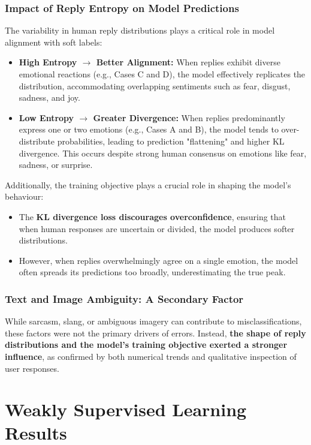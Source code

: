 \subsubsection*{Impact of Reply Entropy on Model Predictions}
The variability in human reply distributions plays a critical role in model alignment with soft labels:
\begin{itemize}
    \item \textbf{High Entropy $\rightarrow$ Better Alignment:} When replies exhibit diverse emotional reactions (e.g., Cases C and D), the model effectively replicates the distribution, accommodating overlapping sentiments such as fear, disgust, sadness, and joy.
    \item \textbf{Low Entropy $\rightarrow$ Greater Divergence:} When replies predominantly express one or two emotions (e.g., Cases A and B), the model tends to over-distribute probabilities, leading to prediction "flattening" and higher KL divergence. This occurs despite strong human consensus on emotions like fear, sadness, or surprise.
\end{itemize}

Additionally, the training objective plays a crucial role in shaping the model’s behaviour:
\begin{itemize}
    \item The \textbf{KL divergence loss discourages overconfidence}, ensuring that when human responses are uncertain or divided, the model produces softer distributions.
    \item However, when replies overwhelmingly agree on a single emotion, the model often spreads its predictions too broadly, underestimating the true peak.
\end{itemize}

\subsubsection*{Text and Image Ambiguity: A Secondary Factor}
While sarcasm, slang, or ambiguous imagery can contribute to misclassifications, these factors were not the primary drivers of errors. Instead, \textbf{the shape of reply distributions and the model's training objective exerted a stronger influence}, as confirmed by both numerical trends and qualitative inspection of user responses.


\section{Weakly Supervised Learning Results}
